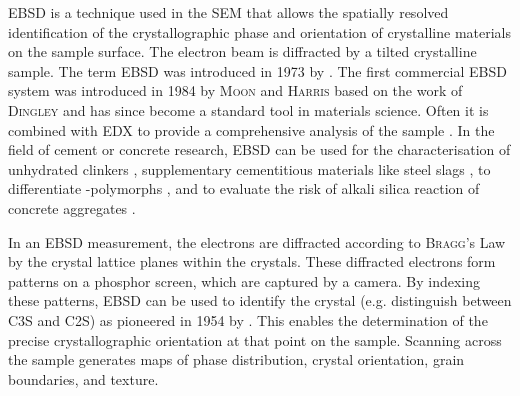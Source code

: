\ac{EBSD} is a technique used in the \ac{SEM} that allows the spatially resolved identification of the crystallographic phase and orientation of crystalline materials on the sample surface.
The electron beam is diffracted by a tilted crystalline sample.
The term \ac{EBSD} was introduced in 1973 by \textcite{venables.1973}.
The first commercial \ac{EBSD} system was introduced in 1984 by \textsc{Moon} and \textsc{Harris} based on the work of \textsc{Dingley} \cite{wright.2000} and has since become a standard tool in materials science.
Often it is combined with \ac{EDX} to provide a comprehensive analysis of the sample \cite{wright.2000}.
In the field of cement or concrete research, \ac{EBSD} can be used for the characterisation of unhydrated clinkers \cite{rossler.2022, rossler.2026}, supplementary cementitious materials like steel slags \cite{rossler.2023, derensy.2026}, to differentiate -polymorphs \cite{rossler.2026a}, and to evaluate the risk of alkali silica reaction of concrete aggregates \cite{rossler.2017a}.

In an \ac{EBSD} measurement, the electrons are diffracted according to \textsc{Bragg}'s Law \cite{bragg.1913} by the crystal lattice planes within the crystals.
These diffracted electrons form \textcite{kikuchi.1928} patterns on a phosphor screen, which are captured by a camera.
By indexing these patterns, \ac{EBSD} can be used to identify the crystal (e.g. distinguish between \ac{C3S} and \ac{C2S}) as pioneered in 1954 by \textcite{alam.1954}.
This enables the determination of the precise crystallographic orientation at that point on the sample.
Scanning across the sample generates maps of phase distribution, crystal orientation, grain boundaries, and texture.

